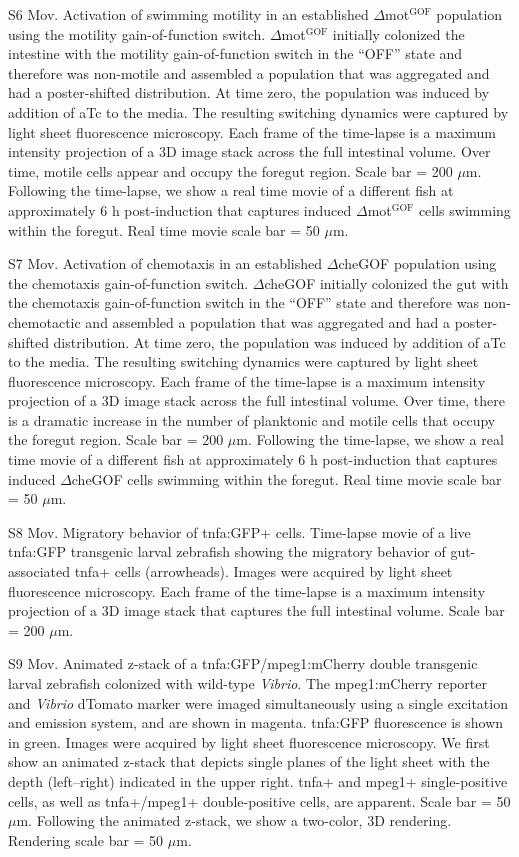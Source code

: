 {{{{{{{{{{{S6 Mov. Activation of swimming motility in an established $\Delta$mot$^{\text{GOF}}$ population using the motility gain-of-function switch. 
$\Delta$mot$^{\text{GOF}}$ initially colonized the intestine with the motility gain-of-function switch in the ``OFF'' state and therefore was non-motile and assembled a population that was aggregated and had a poster-shifted distribution. At time zero, the population was induced by addition of aTc to the media. The resulting switching dynamics were captured by light sheet fluorescence microscopy. Each frame of the time-lapse is a maximum intensity projection of a 3D image stack across the full intestinal volume. Over time, motile cells appear and occupy the foregut region. Scale bar = 200 $\mu$m. Following the time-lapse, we show a real time movie of a different fish at approximately 6 h post-induction that captures induced $\Delta$mot$^{\text{GOF}}$ cells swimming within the foregut. Real time movie scale bar = 50 $\mu$m.

S7 Mov. Activation of chemotaxis in an established $\Delta$cheGOF population using the chemotaxis gain-of-function switch. 
$\Delta$cheGOF initially colonized the gut with the chemotaxis gain-of-function switch in the ``OFF'' state and therefore was non-chemotactic and assembled a population that was aggregated and had a poster-shifted distribution. At time zero, the population was induced by addition of aTc to the media. The resulting switching dynamics were captured by light sheet fluorescence microscopy. Each frame of the time-lapse is a maximum intensity projection of a 3D image stack across the full intestinal volume. Over time, there is a dramatic increase in the number of planktonic and motile cells that occupy the foregut region. Scale bar = 200 $\mu$m. Following the time-lapse, we show a real time movie of a different fish at approximately 6 h post-induction that captures induced $\Delta$cheGOF cells swimming within the foregut. Real time movie scale bar = 50 $\mu$m.

S8 Mov. Migratory behavior of tnfa:GFP+ cells. 
Time-lapse movie of a live tnfa:GFP transgenic larval zebrafish showing the migratory behavior of gut-associated tnfa+ cells (arrowheads). Images were acquired by light sheet fluorescence microscopy. Each frame of the time-lapse is a maximum intensity projection of a 3D image stack that captures the full intestinal volume. Scale bar = 200 $\mu$m.

S9 Mov. Animated z-stack of a tnfa:GFP/mpeg1:mCherry double transgenic larval zebrafish colonized with wild-type \textit{Vibrio}. 
The mpeg1:mCherry reporter and \textit{Vibrio} dTomato marker were imaged simultaneously using a single excitation and emission system, and are shown in magenta. tnfa:GFP fluorescence is shown in green. Images were acquired by light sheet fluorescence microscopy. We first show an animated z-stack that depicts single planes of the light sheet with the depth (left–right) indicated in the upper right. tnfa+ and mpeg1+ single-positive cells, as well as tnfa+/mpeg1+ double-positive cells, are apparent. Scale bar = 50 $\mu$m. Following the animated z-stack, we show a two-color, 3D rendering. Rendering scale bar = 50 $\mu$m.

}}}}}}}}}}}
